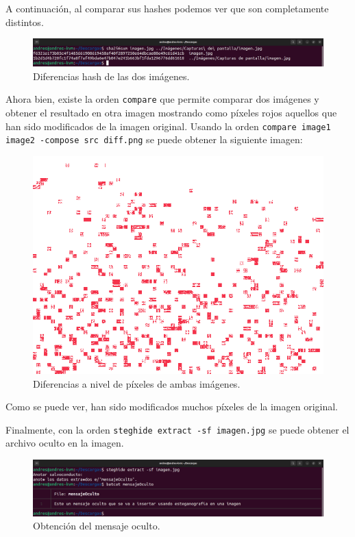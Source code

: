 \documentclass{article}
\begin{document}
A continuación, al comparar sus hashes podemos ver que son completamente distintos.

\begin{figure}[H]
    \includegraphics[width=\textwidth]{imagenes/Captura desde 2022-10-30 11-38-52.png}
    \caption{Diferencias hash de las dos imágenes.}
\end{figure}

\newpage

Ahora bien, existe la orden \verb|compare| que permite comparar dos imágenes y obtener el resultado en otra imagen mostrando como píxeles rojos aquellos que han sido modificados de la imagen original. Usando la orden \verb|compare image1 image2 -compose src diff.png| se puede obtener la siguiente imagen:

\begin{figure}[H]
    \includegraphics[width=\textwidth]{imagenes/diff.png}
    \caption{Diferencias a nivel de píxeles de ambas imágenes.}
\end{figure}

\bigskip

Como se puede ver, han sido modificados muchos píxeles de la imagen original.

\bigskip

Finalmente, con la orden \verb|steghide extract -sf imagen.jpg| se puede obtener el archivo oculto en la imagen.

\begin{figure}[H]
    \includegraphics[width=\textwidth]{imagenes/Captura desde 2022-10-30 11-44-23.png}
    \caption{Obtención del mensaje oculto.}
\end{figure}
\end{document}
